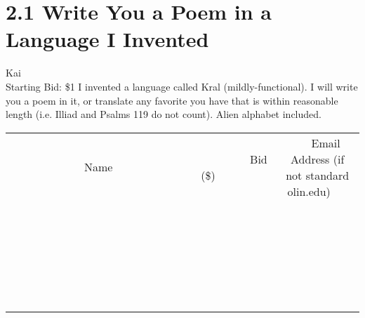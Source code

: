 \documentclass[11pt]{article}
\begin{document}
\section*{2.1 Write You a Poem in a Language I Invented}
Kai
\\
Starting Bid: \$1
\newline
I invented a language called Kral (mildly-functional). I will write you a poem in it, or translate any favorite you have that is within reasonable length (i.e. Illiad and Psalms 119 do not count). Alien alphabet included.
\\[6ex]
\begin{tabular}{c c c}
~~~~~~~~~~~~~Name~~~~~~~~~~~~~ & ~~~~~~~~~Bid (\$)~~~~~~~~~  & ~~~Email Address (if not standard olin.edu)~~~\\
 & & \\
\hline
 & & \\
\hline
 & & \\
\hline
 & & \\
\hline
 & & \\
\hline
 & & \\
\hline
 & & \\
\hline
 & & \\
\hline
 & & \\
\hline
 & & \\
\hline
 & & \\
\hline
 & & \\
\hline
 & & \\
\hline
 & & \\
\hline
 & & \\
\hline
 & & \\
\hline
 & & \\
\hline
 & & \\
\hline
 & & \\
\hline
 & & \\
\hline
 & & \\
\hline
 & & \\
\hline
 & & \\
\hline
 & & \\
\hline
 & & \\
\hline
 & & \\
\hline
\end{tabular}
\newpage
\end{document}
